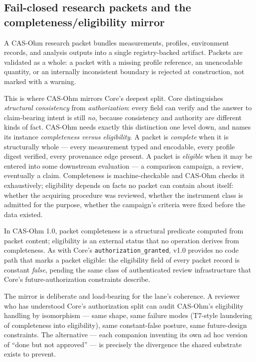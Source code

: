 \subsection{Fail-closed research packets and the completeness/eligibility mirror}\label{integ:ohm:packets}

A CAS-Ohm research packet bundles measurements, profiles, environment records, and analysis outputs into a single registry-backed artifact. Packets are validated as a whole: a packet with a missing profile reference, an unencodable quantity, or an internally inconsistent boundary is rejected at construction, not marked with a warning.

This is where CAS-Ohm mirrors Core's deepest split. Core distinguishes \emph{structural consistency} from \emph{authorization}: every field can verify and the answer to claim-bearing intent is still \emph{no}, because consistency and authority are different kinds of fact. CAS-Ohm needs exactly this distinction one level down, and names its instance \emph{completeness versus eligibility}. A packet is \emph{complete} when it is structurally whole --- every measurement typed and encodable, every profile digest verified, every provenance edge present. A packet is \emph{eligible} when it may be entered into some downstream evaluation --- a comparison campaign, a review, eventually a claim. Completeness is machine-checkable and CAS-Ohm checks it exhaustively; eligibility depends on facts no packet can contain about itself: whether the acquiring procedure was reviewed, whether the instrument class is admitted for the purpose, whether the campaign's criteria were fixed before the data existed.

\begin{invariant}\label{integ:inv:mirror}
In CAS-Ohm 1.0, packet completeness is a structural predicate computed from packet content; eligibility is an external status that no operation derives from completeness. As with Core's \texttt{authorization\_granted}, v1.0 provides no code path that marks a packet eligible: the eligibility field of every packet record is constant \emph{false}, pending the same class of authenticated review infrastructure that Core's future-authorization constraints describe.
\end{invariant}

The mirror is deliberate and load-bearing for the lane's coherence. A reviewer who has understood Core's authorization split can audit CAS-Ohm's eligibility handling by isomorphism --- same shape, same failure modes (T7-style laundering of completeness into eligibility), same constant-false posture, same future-design constraints. The alternative --- each companion inventing its own ad hoc version of ``done but not approved'' --- is precisely the divergence the shared substrate exists to prevent.

